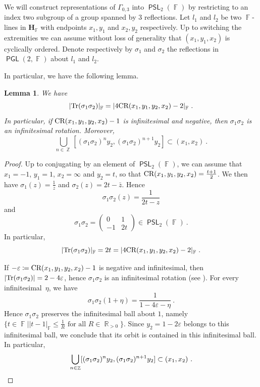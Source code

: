 \documentclass{amsart}
\theoremstyle{plain}
\newtheorem{lemma}[proposition]{Lemma}
\theoremstyle{definition}
\DeclareMathOperator{\PSL}{\mathsf{PSL}}
\DeclareMathOperator{\PGL}{\mathsf{PGL}}
\DeclareMathOperator{\Fb}{{\mathbb{F}}}
\DeclareMathOperator{\Rb}{{\mathbb{R}}}
\DeclareMathOperator{\Zb}{\mathbb{Z}}
\newcommand{\Tr}{\textnormal{Tr}}
\newcommand{\1}{\mathbf{1}}
\begin{document}
We will construct representations of $\Gamma_{0,3}$ into $\PSL_2(\Fb)$ by restricting to an index two subgroup of a group spanned by $3$ reflections.
Let $l_1$ and $l_2$ be two $\Fb$-lines in $\mathbf{H}_{\Fb}$ with endpoints $x_1,y_1$ and $x_2, y_2$ respectively. Up to switching the extremities we can assume without loss of generality that $(x_1,y_1,x_2)$ is cyclically ordered.
Denote respectively by $\sigma_1$ and $\sigma_2$ the reflections in $\PGL(2,\Fb)$ about $l_1$ and $l_2$.

In particular, we have the following lemma.

\begin{lemma}
\label{lem: CRBigInf}
We have
\[ \vert \Tr(\sigma_1\sigma_2) \vert_{\Fb} = \vert 4\textnormal{CR}(x_1,y_1,y_2,x_2)-2 \vert_{\Fb}~.\]
In particular, if $\textnormal{CR}(x_1,y_1,y_2,x_2)-1$ is infinitesimal and negative, then $\sigma_1 \sigma_2$ is an infinitesimal rotation. Moreover, \[\bigcup_{n\in \Zb} [(\sigma_1\sigma_2)^ny_2, (\sigma_1\sigma_2)^{n+1} y_2] \subset (x_1, x_2)~.\] 
\end{lemma}

\begin{proof}
Up to conjugating by an element of $\PSL_2(\Fb)$, we can assume that $x_1=-1$, $y_1=1$, $x_2=\infty$ and $y_2 =t$, so that $\textnormal{CR}(x_1,y_1,y_2,x_2)= \frac{t+1}{2}$. We then have $\sigma_1(z) = \frac{1}{\bar z}$ and $\sigma_2(z) = 2 t - \bar z$. Hence
\[\sigma_1\sigma_2(z) = \frac{1}{2t -z}\]
and
\[\sigma_1 \sigma_2 = \left( \begin{matrix} 0 & 1\\ -1 & 2 t \end{matrix} \right) \in \PSL_2(\Fb)~.\]
In particular, 
\[\vert \textnormal{Tr}(\sigma_1 \sigma_2) \vert_{\Fb}= 2t = \vert 4\textnormal{CR}(x_1,y_1,y_2,x_2) -2 \vert_{\Fb}~.\\ \]

If $ -\varepsilon \coloneqq \textnormal{CR}(x_1,y_1,y_2,x_2) - 1$ is negative and infinitesimal, then $\vert \textnormal{Tr}(\sigma_1 \sigma_2)\vert = 2-4\varepsilon$, hence $\sigma_1\sigma_2$ is an infinitesimal rotation (see ).
For every infinitesimal~$\eta$, we have
\[\sigma_1\sigma_2(1+\eta) = \frac{1}{1-4\varepsilon -\eta}~.\]
Hence $\sigma_1\sigma_2$ preserves the infinitesimal ball about $1$, namely $\{t\in \Fb \mid \vert t-1\vert_{\Fb} \leq \frac{1}{R} \textrm{ for all $R\in \Rb_{>0}$}\}$.
Since $y_2=1-2\varepsilon$ belongs to this infinitesimal ball, we conclude that its orbit is contained in this infinitesimal ball.
In particular,
\[\bigcup_{n\in \Zb} [(\sigma_1\sigma_2)^ny_2, (\sigma_1\sigma_2)^{n+1} y_2] \subset (x_1, x_2)~. \qedhere\] 
\end{proof}
\end{document}
